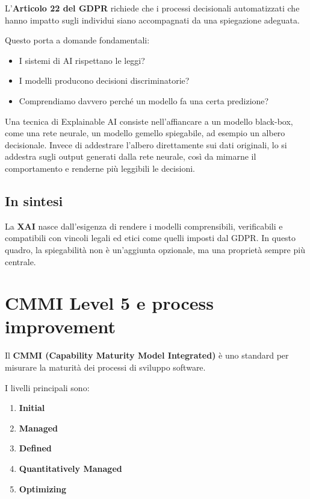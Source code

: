 L'\textbf{Articolo 22 del GDPR} richiede che i processi decisionali automatizzati che hanno impatto sugli individui siano accompagnati da una spiegazione adeguata.

Questo porta a domande fondamentali:
\begin{itemize}
    \item I sistemi di AI rispettano le leggi?
    \item I modelli producono decisioni discriminatorie?
    \item Comprendiamo davvero perché un modello fa una certa predizione?
\end{itemize}

\begin{notaprof}
Una tecnica di Explainable AI consiste nell'affiancare a un modello black-box, come una rete neurale, un modello gemello spiegabile, ad esempio un albero decisionale. Invece di addestrare l'albero direttamente sui dati originali, lo si addestra sugli output generati dalla rete neurale, così da mimarne il comportamento e renderne più leggibili le decisioni.
\end{notaprof}

\subsection*{In sintesi}
La \textbf{XAI} nasce dall'esigenza di rendere i modelli comprensibili, verificabili e compatibili con vincoli legali ed etici come quelli imposti dal GDPR. In questo quadro, la spiegabilità non è un'aggiunta opzionale, ma una proprietà sempre più centrale.

\section{CMMI Level 5 e process improvement}

Il \textbf{CMMI (Capability Maturity Model Integrated)} è uno standard per misurare la maturità dei processi di sviluppo software.

I livelli principali sono:
\begin{enumerate}
    \item \textbf{Initial}
    \item \textbf{Managed}
    \item \textbf{Defined}
    \item \textbf{Quantitatively Managed}
    \item \textbf{Optimizing}
\end{enumerate}

